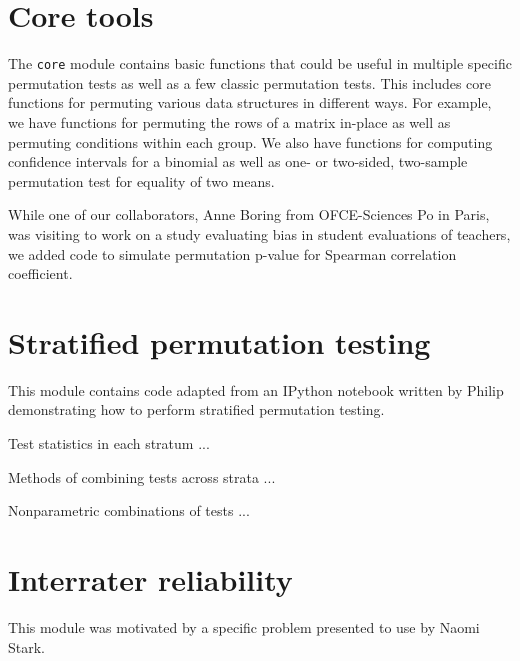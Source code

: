 \section{Core tools}

The \texttt{core} module contains basic functions that could be useful in
multiple specific permutation tests as well as a few classic permutation tests.
This includes core functions for permuting various data structures in different
ways.  For example, we have functions for permuting the rows of a matrix
in-place as well as permuting conditions within each group. We also have
functions for computing confidence intervals for a binomial as well as
one- or two-sided, two-sample permutation test for equality of two means.

While one of our collaborators, Anne Boring from OFCE-Sciences Po in Paris, was
visiting to work on a study evaluating bias in student evaluations of teachers,
we added code to simulate permutation p-value for Spearman correlation
coefficient.\cite{boring2015}

\section{Stratified permutation testing}

This module contains code adapted from an IPython notebook written by
Philip demonstrating how to perform stratified permutation testing.

Test statistics in each stratum ...

Methods of combining tests across strata ...

Nonparametric combinations of tests ...

\section{\label{sec:irr}Interrater reliability}

This module was motivated by a specific problem presented to use by
Naomi Stark.
%


